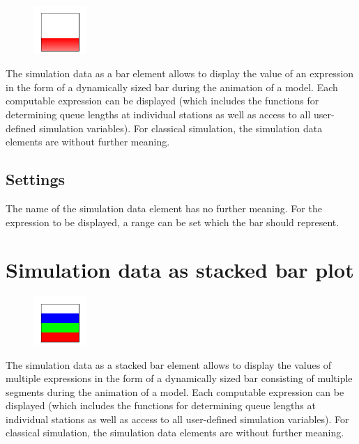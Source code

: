 \begin{figure}
\vspace{-22pt}
\includegraphics[width=2cm]{imageModelElementAnimationBar.png}
\vspace{-22pt}
\end{figure}

The simulation data as a bar element allows to display the value of an expression in the form of a dynamically sized
bar during the animation of a model. Each computable expression can be displayed (which includes the functions for
determining queue lengths at individual stations as well as access to all user-defined simulation variables).
For classical simulation, the simulation data elements are without further meaning.

\subsection*{Settings}

The name of the simulation data element has no further meaning.
For the expression to be displayed, a range can be set which the bar should represent.


\section{Simulation data as stacked bar plot}
\label{ref:ModelElementAnimationBarStack}

\begin{figure}
\vspace{-22pt}
\includegraphics[width=2cm]{imageModelElementAnimationBarStack.png}
\vspace{-22pt}
\end{figure}

The simulation data as a stacked bar element allows to display the values of multiple expressions in the form of
a dynamically sized bar consisting of multiple segments during the animation of a model. Each computable expression
can be displayed (which includes the functions for determining queue lengths at individual stations as well as access
to all user-defined simulation variables). For classical simulation, the simulation data elements are without further meaning.

